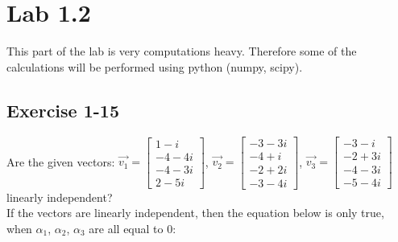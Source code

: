 \documentclass{article}
\begin{document}
    
    \section*{Lab 1.2}
        This part of the lab is very computations heavy. Therefore some of the calculations will be performed using python (numpy, scipy).
        \subsection*{Exercise 1-15}
            Are the given vectors: 
            $
                \vec{v_1} = 
                \begin{bmatrix} 1 - i \\ -4 - 4i \\ -4 - 3i \\ 2 - 5i \end{bmatrix}
            $, 
            $
                \vec{v_2} = \begin{bmatrix} -3 - 3i \\ -4 + i \\ -2 + 2i \\ -3 - 4i \end{bmatrix}
            $, 
            $
                \vec{v_3} = \begin{bmatrix} -3 - i \\ -2 + 3i \\ -4 - 3i \\ -5 - 4i \end{bmatrix}
            $ 
            linearly independent? \\
            If the vectors are linearly independent, then the equation below is only true, when $\alpha_1$, $\alpha_2$, $\alpha_3$ are all equal to 0:
\end{document}
